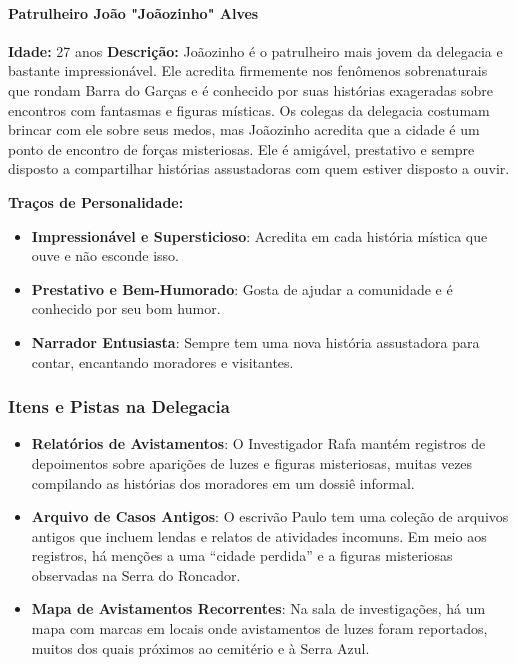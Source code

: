\begin{personagem}  
\paragraph{Patrulheiro João "Joãozinho" Alves}  
\textbf{Idade:} 27 anos  
\textbf{Descrição:}  
Joãozinho é o patrulheiro mais jovem da delegacia e bastante impressionável. Ele acredita firmemente nos fenômenos sobrenaturais que rondam Barra do Garças e é conhecido por suas histórias exageradas sobre encontros com fantasmas e figuras místicas. Os colegas da delegacia costumam brincar com ele sobre seus medos, mas Joãozinho acredita que a cidade é um ponto de encontro de forças misteriosas. Ele é amigável, prestativo e sempre disposto a compartilhar histórias assustadoras com quem estiver disposto a ouvir.

\textbf{Traços de Personalidade:}
\begin{itemize}
    \item \textbf{Impressionável e Supersticioso}: Acredita em cada história mística que ouve e não esconde isso.
    \item \textbf{Prestativo e Bem-Humorado}: Gosta de ajudar a comunidade e é conhecido por seu bom humor.
    \item \textbf{Narrador Entusiasta}: Sempre tem uma nova história assustadora para contar, encantando moradores e visitantes.
\end{itemize}
\end{personagem}

\subsubsection{Itens e Pistas na Delegacia}

\begin{itemize}
    \item \textbf{Relatórios de Avistamentos}: O Investigador Rafa mantém registros de depoimentos sobre aparições de luzes e figuras misteriosas, muitas vezes compilando as histórias dos moradores em um dossiê informal.
    \item \textbf{Arquivo de Casos Antigos}: O escrivão Paulo tem uma coleção de arquivos antigos que incluem lendas e relatos de atividades incomuns. Em meio aos registros, há menções a uma “cidade perdida” e a figuras misteriosas observadas na Serra do Roncador.
    \item \textbf{Mapa de Avistamentos Recorrentes}: Na sala de investigações, há um mapa com marcas em locais onde avistamentos de luzes foram reportados, muitos dos quais próximos ao cemitério e à Serra Azul.
\end{itemize}

